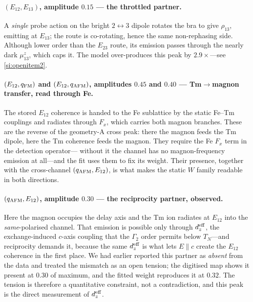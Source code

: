\documentclass[11pt]{article}
\newcommand{\qafm}{q_{\rm AFM}}
\newcommand{\qfm}{q_{\rm FM}}
\begin{document}
\paragraph{$(E_{12},E_{13})$, amplitude $0.15$ --- the throttled
partner.}
A \emph{single} probe action on the bright $2\!\leftrightarrow\!3$
dipole rotates the bra to give $\rho_{13}$, emitting at $E_{13}$; the
route is co-rotating, hence the same non-rephasing side.  Although lower
order than the $E_{23}$ route, its emission passes through the nearly
dark $\mu^z_{13}$, which caps it.  The model over-produces this peak by
$2.9\times$---see \cref{si:openitem2}.

\paragraph{$(E_{12},\qfm)$ and $(E_{12},\qafm)$, amplitudes $0.45$ and
$0.40$ --- Tm$\to$magnon transfer, read through Fe.}
The stored $E_{12}$ coherence is handed to the Fe sublattice by the
static Fe--Tm couplings and radiates through $F_x$, which carries both
magnon branches.  These are the reverse of the geometry-A cross peak:
there the magnon feeds the Tm dipole, here the Tm coherence feeds the
magnon.  They require the Fe $F_x$ term in the detection operator---%
without it the channel has no magnon-frequency emission at all---and the
fit uses them to fix its weight.  Their presence, together with the
cross-channel $(\qafm,E_{12})$, is what makes the static $W$ family
readable in both directions.

\paragraph{$(\qafm,E_{12})$, amplitude $0.30$ --- the reciprocity
partner, observed.}
Here the magnon occupies the delay axis and the Tm ion radiates at
$E_{12}$ into the \emph{same}-polarised channel.  That emission is
possible only through $d_z^{\rm eff}$, the exchange-induced $c$-axis
coupling that the $\Gamma_2$ order permits below $T_N$---and reciprocity
demands it, because the same $d_z^{\rm eff}$ is what lets
$E\!\parallel\!c$ create the $E_{12}$ coherence in the first place.  We
had earlier reported this partner as \emph{absent} from the data and
treated the mismatch as an open tension; the digitised map shows it
present at $0.30$ of maximum, and the fitted weight reproduces it at
$0.32$.  The tension is therefore a quantitative constraint, not a
contradiction, and this peak is the direct measurement of
$d_z^{\rm eff}$.
\end{document}
